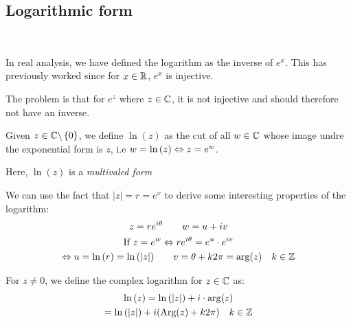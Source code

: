 \subsection{Logarithmic form}\hfill\\\par
\noindent In real analysis, we have defined the logarithm as the inverse of $e^x$. This has previously worked since for $x\in\mathbb{R}$, $e^x$ is injective.\par
\noindent The problem is that for $e^z$ where $z\in\mathbb{C}$, it is not injective and should therefore not have an inverse.
\par\bigskip
\noindent Given $z\in\mathbb{C}\backslash\left\{0\right\}$, we define $\ln{\left(z\right)}$ as the cut of all $w\in\mathbb{C}$ whose image undre the exponential form is $z$, i.e $w = \ln{\left(z\right)}\Leftrightarrow z = e^w$.
\par\bigskip
\noindent Here, $\ln{\left(z\right)}$  is a \textit{multivaled form}
\par\bigskip
\noindent We can use the fact that $\left|z\right| = r = e^x$ to derive some interesting properties of the logarithm:
\begin{equation*}
  \begin{gathered}
    z = re^{i\theta}\qquad w= u+iv\\
    \text{If } z=e^w\Leftrightarrow re^{i\theta} = e^u\cdot e^{iv}\\
    \Leftrightarrow u = \ln{\left(r\right)} = \ln{\left(\left|z\right|\right)}\qquad v = \theta+k2\pi = \text{arg}(z)\quad k\in\mathbb{Z}
  \end{gathered}
\end{equation*}
\par\bigskip
\begin{theo}{}
  For $z\neq0$, we define the complex logarithm for $z\in\mathbb{C}$  as:
  \begin{equation*}
    \begin{gathered}
      \ln{\left(z\right)} = \ln{\left(\left|z\right|\right)}+i\cdot\text{arg}(z)\\
      = \ln{\left(\left|z\right|\right)}+i(\text{Arg}(z)+k2\pi)\quad k\in\mathbb{Z}
    \end{gathered}
  \end{equation*}
\end{theo}
